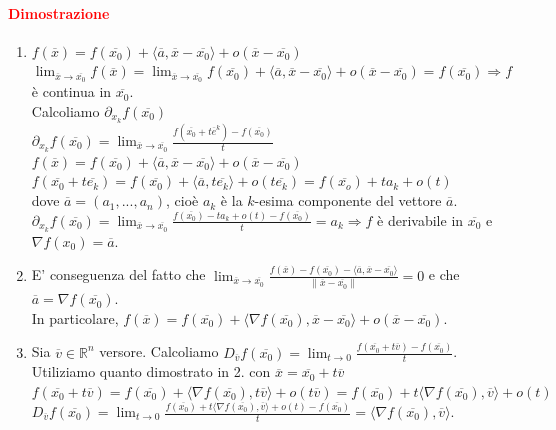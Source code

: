 \documentclass{article}
\newcommand{\R}{\mathbb{R}}
\begin{document}
\paragraph{\textcolor{red}{Dimostrazione}}
\begin{enumerate}
    \item $f(\overline{x})=f(\overline{x_0})+\langle \overline{a},\overline{x}-\overline{x_0} \rangle+o(\overline{x}-\overline{x_0})$\\
    $\lim_{\overline{x}\rightarrow\overline{x_0}}f(\overline{x})=\lim_{\overline{x}\rightarrow\overline{x_0}}f(\overline{x_0})+\langle \overline{a},\overline{x}-\overline{x_0} \rangle+o(\overline{x}-\overline{x_0})=f(\overline{x_0})\Rightarrow f$ è continua in $\overline{x_0}$.\\
    Calcoliamo $\partial_{x_k}f(\overline{x_0})$\\
    $\partial_{x_k}f(\overline{x_0})=\lim_{\overline{x}\rightarrow\overline{x_0}}\frac{f(\overline{x_0}+t\overline{e}^k)-f(\overline{x_0})}{t}$\\
    $f(\overline{x})=f(\overline{x_0})+\langle\overline{a},\overline{x}-\overline{x_0}\rangle+o(\overline{x}-\overline{x_0})$\\
    $f(\overline{x_0}+t\overline{e_k})=f(\overline{x_0})+\langle\overline{a},t\overline{e_k}\rangle+o(t\overline{e_k})=f(\overline{x_o})+ta_k+o(t) $\\
    dove $\overline{a}=(a_1,...,a_n)$, cioè $a_k$ è la $k$-esima componente del vettore $\overline{a}$.\\
    $\partial_{x_k}f(\overline{x_0})=\lim_{\overline{x}\rightarrow\overline{x_0}}\frac{f(\overline{x_0})-ta_k+o(t)-f(\overline{x_0})}{t}=a_k \Rightarrow f$ è derivabile in $\overline{x_0}$ e $\nabla f(x_0)=\overline{a}$.
    \item E' conseguenza del fatto che $\lim_{\overline{x}\rightarrow\overline{x_0}}\frac{f(\overline{x})-f(\overline{x_0})-\langle\overline{a},\overline{x}-\overline{x_0}\rangle}{\|\overline{x}-\overline{x_0}\|}=0$ e che $\overline{a}=\nabla f(\overline{x_0})$.\\
    In particolare, $f(\overline{x})=f(\overline{x_0})+\langle \nabla f(\overline{x_0}),\overline{x}-\overline{x_0} \rangle +o(\overline{x}-\overline{x_0})$.
    \item Sia $\overline{v}\in \R^n$ versore. Calcoliamo $D_{\overline{v}}f(\overline{x_0})=\lim_{t\rightarrow0}\frac{f(\overline{x_0}+t\overline{v})-f(\overline{x_0})}{t}$.\\
    Utiliziamo quanto dimostrato in 2. con $\overline{x}=\overline{x_0}+t\overline{v}$\\
    $f(\overline{x_0}+t\overline{v})=f(\overline{x_0})+\langle \nabla f(\overline{x_0}), t\overline{v} \rangle + o(t\overline{v})=f(\overline{x_0})+t\langle \nabla f(\overline{x_0}),\overline{v} \rangle +o(t)$\\
    $D_{\overline{v}}f(\overline{x_0})=\lim_{t\rightarrow 0}\frac{f(\overline{x_0})+t\langle\nabla f(\overline{x_0}),\overline{v}\rangle+o(t)-f(\overline{x_0})}{t}=\langle \nabla f(\overline{x_0}),\overline{v} \rangle$.
\end{enumerate}
\begin{flushright}
    \Lightning
\end{flushright}
\end{document}
